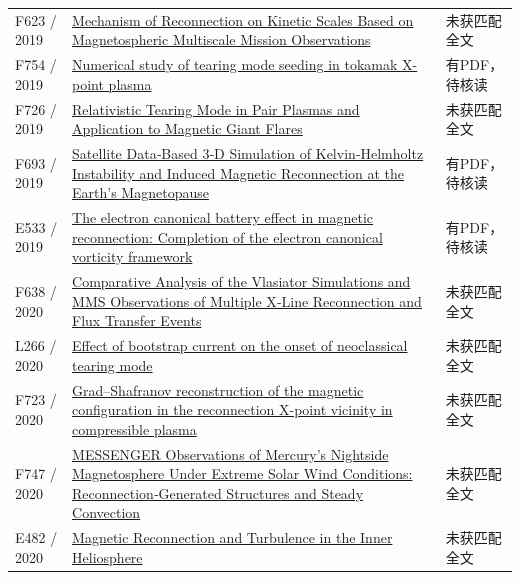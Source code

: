 \begin{longtable}{P{24mm}P{97mm}P{27mm}}
F623 / 2019 & \href{https://doi.org/10.3847/2041-8213/ab4b5a}{Mechanism of Reconnection on Kinetic Scales Based on Magnetospheric Multiscale Mission Observations} & 未获匹配全文\\

F754 / 2019 & \href{https://doi.org/10.1063/1.5086402}{Numerical study of tearing mode seeding in tokamak X-point plasma} & 有PDF，待核读\\

F726 / 2019 & \href{https://doi.org/10.3847/1538-4357/ab29f6}{Relativistic Tearing Mode in Pair Plasmas and Application to Magnetic Giant Flares} & 未获匹配全文\\

F693 / 2019 & \href{https://doi.org/10.1029/2019gl083282}{Satellite Data‐Based 3‐D Simulation of Kelvin‐Helmholtz Instability and Induced Magnetic Reconnection at the Earth's Magnetopause} & 有PDF，待核读\\

E533 / 2019 & \href{https://doi.org/10.1063/1.5122225}{The electron canonical battery effect in magnetic reconnection: Completion of the electron canonical vorticity framework} & 有PDF，待核读\\

F638 / 2020 & \href{https://doi.org/10.1029/2019ja027410}{Comparative Analysis of the Vlasiator Simulations and MMS Observations of Multiple X‐Line Reconnection and Flux Transfer Events} & 未获匹配全文\\

L266 / 2020 & \href{https://doi.org/10.1088/1741-4326/ab9564}{Effect of bootstrap current on the onset of neoclassical tearing mode} & 未获匹配全文\\

F723 / 2020 & \href{https://doi.org/10.1063/5.0015240}{Grad–Shafranov reconstruction of the magnetic configuration in the reconnection X-point vicinity in compressible plasma} & 未获匹配全文\\

F747 / 2020 & \href{https://doi.org/10.1029/2019ja027490}{MESSENGER Observations of Mercury's Nightside Magnetosphere Under Extreme Solar Wind Conditions: Reconnection‐Generated Structures and Steady Convection} & 未获匹配全文\\

E482 / 2020 & \href{https://escholarship.org/uc/item/0nv873w9}{Magnetic Reconnection and Turbulence in the Inner Heliosphere} & 未获匹配全文\\


\end{longtable}
